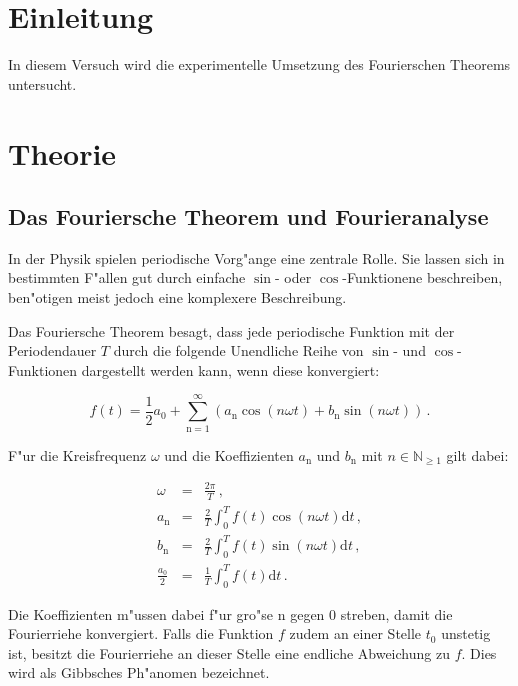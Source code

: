 \section{Einleitung} %
\label{sec:einleitung}
	In diesem Versuch wird die experimentelle Umsetzung des Fourierschen Theorems untersucht.
	
\section{Theorie} %
\label{sec:theorie}
	\subsection{Das Fouriersche Theorem und Fourieranalyse}
	\label{subsec:fourier}

		In der Physik spielen periodische Vorg"ange eine zentrale Rolle.
		Sie lassen sich in bestimmten F"allen gut durch einfache $\sin$- oder $\cos$-Funktionene beschreiben, ben"otigen meist jedoch eine komplexere Beschreibung.

		Das Fouriersche Theorem besagt, dass jede periodische Funktion mit der Periodendauer $T$ durch die folgende Unendliche Reihe von $\sin$- und $\cos$-Funktionen dargestellt werden kann, wenn diese konvergiert:

		\begin{equation}
			f(t) = \frac{1}{2}a_0 + \sum_{\mathrm{n}=1}^\infty \left(a_\mathrm{n} \cos{\left(n \omega t\right)} + b_\mathrm{n} \sin{\left(n \omega t\right)}\right) \,. \label{eqn:fourier}
		\end{equation}

		F"ur die Kreisfrequenz $\omega$ und die Koeffizienten $a_\mathrm{n}$ und $b_\mathrm{n}$ mit $n \in \mathbb{N}_{\geq 1}$ gilt dabei:

		\begin{eqnarray}
			\nonumber \omega & = & \frac{2 \pi}{T} \,, \\
			\label{eqn:a_n} a_\mathrm{n} & = & \frac{2}{T} \int_0^T{f(t) \cos{\left(n \omega t\right)} \mathrm{d}t} \,, \\
			\label{eqn:b_n} b_\mathrm{n} & = & \frac{2}{T} \int_0^T{f(t) \sin{\left(n \omega t\right)} \mathrm{d}t} \,, \\
			\nonumber \frac{a_0}{2} & = & \frac{1}{T} \int_0^T{f(t) \mathrm{d}t} \,.
		\end{eqnarray}

		Die Koeffizienten m"ussen dabei f"ur gro"se n gegen 0 streben, damit die Fourierriehe konvergiert.
		Falls die Funktion $f$ zudem an einer Stelle $t_0$ unstetig ist, besitzt die Fourierriehe an dieser Stelle eine endliche Abweichung zu $f$.
		Dies wird als Gibbsches Ph"anomen bezeichnet.

